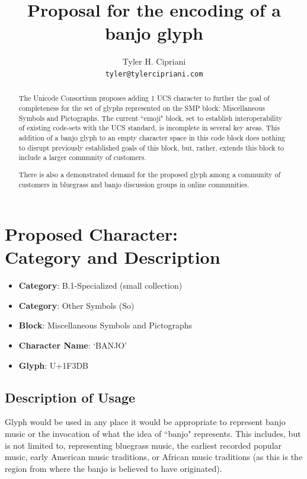 \documentclass[12pt]{article}
\author{Tyler H. Cipriani\\
  \texttt{tyler@tylercipriani.com}}
\title{Proposal for the encoding of a banjo glyph}
\begin{document}
  \maketitle

  \renewcommand{\abstractname}{Proposal}

  \begin{abstract}
    The Unicode Consortium proposes adding 1 UCS character to further the goal of completeness
    for the set of glyphs represented on the SMP block: Miscellaneous Symbols and Pictographs\cite{scherer}.
    The current ``emoji" block, set to establish interoperability of existing code-sets
    with the UCS standard, is incomplete in several key areas. This addition of
    a banjo glyph to an empty character space in this code block does nothing to
    disrupt previously established goals of this block, but, rather, extends this
    block to include a larger community of customers.

    There is also a demonstrated demand for the proposed glyph among a community of
    customers in bluegrass and banjo discussion groups in online communities.
  \end{abstract}

  \section[Proposed Character: Category and Description]{Proposed Character:\\ Category and Description}
    \begin{itemize}
      \item \textbf{Category}: B.1-Specialized (small collection)
      \item \textbf{Category}: Other Symbols (So)
      \item \textbf{Block}: Miscellaneous Symbols and Pictographs
      \item \textbf{Character Name}: `BANJO'
      \item \textbf{Glyph}:  U+1F3DB
    \end{itemize}

    \subsection{Description of Usage}
      Glyph would be used in any place it would be appropriate to represent 
      banjo music or the invocation of what the idea of ``banjo" represents.
      This includes, but is not limited to, representing bluegrass music,
      the earliest recorded popular music, early American music traditions, or
      African music traditions (as this is the region from where the banjo is
      believed to have originated)\cite{allen}.
\end{document}
